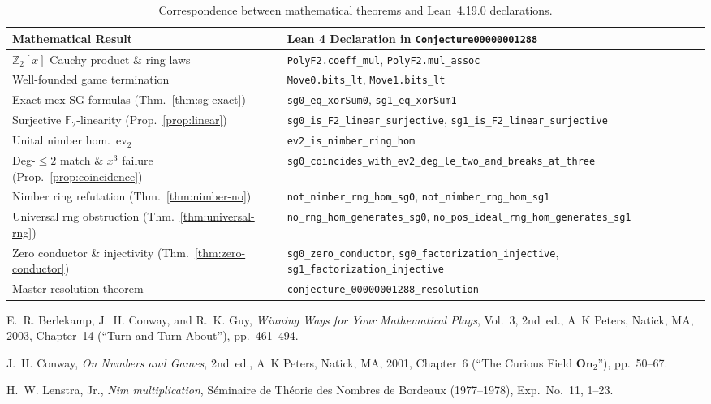 \documentclass[11pt,a4paper]{article}
\theoremstyle{definition}
\newcommand{\F}{\mathbb{F}}
\newcommand{\Z}{\mathbb{Z}}
\newcommand{\mex}{\mathrm{mex}}
\newcommand{\ev}{\mathrm{ev}}
\begin{document}
\begin{table}[ht]
\centering
\caption{Correspondence between mathematical theorems and Lean~4.19.0 declarations.}
\label{tab:lean}
\medskip
{\small
\begin{tabular}{>{\raggedright\arraybackslash}p{}>{\raggedright\arraybackslash}p{}}
\hline
Mathematical Result & Lean 4 Declaration in \texttt{Conjecture00000001288} \\
\hline
$\Z_2[x]$ Cauchy product \& ring laws &
  \texttt{PolyF2.coeff\_mul}, \texttt{PolyF2.mul\_assoc} \\
Well-founded game termination &
  \texttt{Move0.bits\_lt}, \texttt{Move1.bits\_lt} \\
Exact $\mex$ SG formulas (Thm.~\ref{thm:sg-exact}) &
  \texttt{sg0\_eq\_xorSum0}, \texttt{sg1\_eq\_xorSum1} \\
Surjective $\F_2$-linearity (Prop.~\ref{prop:linear}) &
  \texttt{sg0\_is\_F2\_linear\_surjective},\newline
  \texttt{sg1\_is\_F2\_linear\_surjective} \\
Unital nimber hom.\ $\ev_2$ &
  \texttt{ev2\_is\_nimber\_ring\_hom} \\
Deg-$\le 2$ match \& $x^3$ failure (Prop.~\ref{prop:coincidence}) &
  \texttt{sg0\_coincides\_with\_ev2\_deg\_le\_two\_}\allowbreak\texttt{and\_breaks\_at\_three} \\
Nimber ring refutation (Thm.~\ref{thm:nimber-no}) &
  \texttt{not\_nimber\_rng\_hom\_sg0},\newline
  \texttt{not\_nimber\_rng\_hom\_sg1} \\
Universal rng obstruction (Thm.~\ref{thm:universal-rng}) &
  \texttt{no\_rng\_hom\_generates\_sg0},\newline
  \texttt{no\_pos\_ideal\_rng\_hom\_generates\_sg1} \\
Zero conductor \& injectivity (Thm.~\ref{thm:zero-conductor}) &
  \texttt{sg0\_zero\_conductor},\newline
  \texttt{sg0\_factorization\_injective},\newline
  \texttt{sg1\_factorization\_injective} \\
Master resolution theorem &
  \texttt{conjecture\_00000001288\_resolution} \\
\hline
\end{tabular}
}
\end{table}

\begin{thebibliography}{9}

E.~R. Berlekamp, J.~H. Conway, and R.~K. Guy,
\emph{Winning Ways for Your Mathematical Plays}, Vol.~3, 2nd~ed.,
A~K Peters, Natick, MA, 2003, Chapter~14 (``Turn and Turn About''), pp.~461--494.

J.~H. Conway,
\emph{On Numbers and Games}, 2nd~ed.,
A~K Peters, Natick, MA, 2001, Chapter~6 (``The Curious Field $\mathbf{On}_2$''), pp.~50--67.

H.~W. Lenstra, Jr.,
\emph{Nim multiplication},
S\'eminaire de Th\'eorie des Nombres de Bordeaux (1977--1978), Exp.~No.~11, 1--23.

\end{thebibliography}
\end{document}
